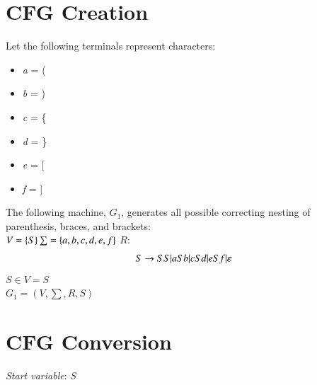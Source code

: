\documentclass[12pt,letterpaper]{article}
\begin{document}
	\section{CFG Creation}
		Let the following terminals represent characters:
		\begin{itemize}
			\item \textit{a} = (
			\item \textit{b} = )
			\item \textit{c} = \{
			\item \textit{d} = \}
			\item \textit{e} = [
			\item \textit{f} = ]
		\end{itemize}
		The following machine, $G_1$, generates all possible correcting nesting of parenthesis, braces, and brackets:\\
		
		$V=\{S\}\\\sum=\{a,b,c,d,e,f\}\\$
		$R:$
		\begin{gather*}
			S \rightarrow SS\arrowvert aSb\arrowvert cSd\arrowvert eSf\arrowvert \varepsilon
		\end{gather*}
		$S\in V=S$\\
		$G_1=(V,\sum,R,S)$
	\section{CFG Conversion}
		\textit{Start variable}: \textit{S}\\
		
\end{document}
